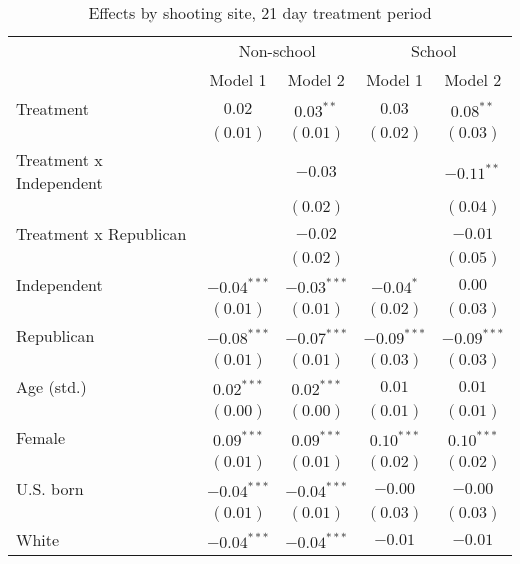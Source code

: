 
\begin{table}
\caption{Effects by shooting site, 21 day treatment period}
\begin{center}
\begin{tabular}{l c c c c}
\toprule
 & \multicolumn{2}{c}{Non-school} & \multicolumn{2}{c}{School} \\
\cmidrule(lr){2-3} \cmidrule(lr){4-5}
 & Model 1 & Model 2 & Model 1 & Model 2 \\
\midrule
Treatment               & $0.02$        & $0.03^{**}$   & $0.03$        & $0.08^{**}$   \\
                        & $(0.01)$      & $(0.01)$      & $(0.02)$      & $(0.03)$      \\
Treatment x Independent &               & $-0.03$       &               & $-0.11^{**}$  \\
                        &               & $(0.02)$      &               & $(0.04)$      \\
Treatment x Republican  &               & $-0.02$       &               & $-0.01$       \\
                        &               & $(0.02)$      &               & $(0.05)$      \\
Independent             & $-0.04^{***}$ & $-0.03^{***}$ & $-0.04^{*}$   & $0.00$        \\
                        & $(0.01)$      & $(0.01)$      & $(0.02)$      & $(0.03)$      \\
Republican              & $-0.08^{***}$ & $-0.07^{***}$ & $-0.09^{***}$ & $-0.09^{***}$ \\
                        & $(0.01)$      & $(0.01)$      & $(0.03)$      & $(0.03)$      \\
Age (std.)              & $0.02^{***}$  & $0.02^{***}$  & $0.01$        & $0.01$        \\
                        & $(0.00)$      & $(0.00)$      & $(0.01)$      & $(0.01)$      \\
Female                  & $0.09^{***}$  & $0.09^{***}$  & $0.10^{***}$  & $0.10^{***}$  \\
                        & $(0.01)$      & $(0.01)$      & $(0.02)$      & $(0.02)$      \\
U.S. born               & $-0.04^{***}$ & $-0.04^{***}$ & $-0.00$       & $-0.00$       \\
                        & $(0.01)$      & $(0.01)$      & $(0.03)$      & $(0.03)$      \\
White                   & $-0.04^{***}$ & $-0.04^{***}$ & $-0.01$       & $-0.01$       \\

\end{tabular}
\end{center}
\end{table}
